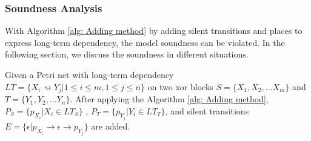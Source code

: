 \subsubsection{Soundness Analysis}
With Algorithm \ref{alg: Adding method} by adding silent transitions and places to express long-term dependency, the model soundness can be violated. In the following section, we discuss the soundness in different situations. 

Given a Petri net with long-term dependency $LT=\{X_i \rightsquigarrow Y_j \vert 1 \leq i \leq m, 1 \leq j \leq n \}$ on two xor blocks $S=\{X_1,X_2,...X_m\}$ and $T=\{Y_1,Y_2,...Y_n\}$. After applying the Algorithm \ref{alg: Adding method}, $P_S=\{p_{X_i} \vert X_i \in LT_{S} \}$ , $P_T=\{p_{Y_j} \vert Y_i \in LT_{T} \}$, and silent transitions $ E = \{\epsilon \vert p_{X_i} \rightarrow \epsilon
\rightarrow p_{Y_{j}} \}$ are added. 
 
